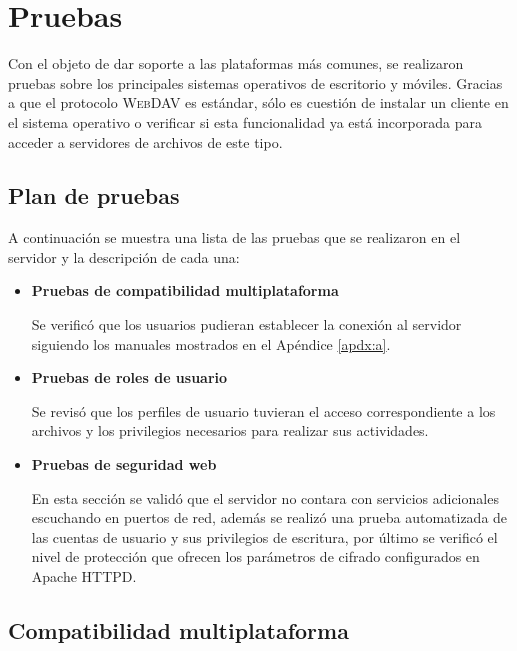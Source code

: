 {
  \linespread{1}
  \cleardoublepage  
  \chapter{Pruebas}
  \label{chap:cap4}
}

Con el objeto de dar soporte a las plataformas m\'{a}s comunes, se realizaron pruebas sobre los principales sistemas operativos de escritorio y m\'{o}viles. Gracias a que el protocolo \textsc{\gls{WebDAV}} es est\'{a}ndar, s\'{o}lo es cuesti\'{o}n de instalar un cliente en el sistema operativo o verificar si esta funcionalidad ya est\'{a} incorporada para acceder a servidores de archivos de este tipo.

    \section {Plan de pruebas}

A continuaci\'{o}n se muestra una lista de las pruebas que se realizaron en el servidor y la descripci\'{o}n de cada una:

\begin{itemize}

  \item \textbf{Pruebas de compatibilidad multiplataforma}

Se verific\'{o} que los usuarios pudieran establecer la conexi\'{o}n al servidor siguiendo los manuales mostrados en el \textup{Ap\'{e}ndice \ref{apdx:a}}.

  \item \textbf{Pruebas de roles de usuario}

Se revis\'{o} que los perfiles de usuario tuvieran el acceso correspondiente a los archivos y los privilegios necesarios para realizar sus actividades.

  \item \textbf{Pruebas de seguridad web}

En esta secci\'{o}n se valid\'{o} que el servidor no contara con servicios adicionales escuchando en puertos de red, adem\'{a}s se realiz\'{o} una prueba automatizada de las cuentas de usuario y sus privilegios de escritura, por \'{u}ltimo se verific\'{o} el nivel de protecci\'{o}n que ofrecen los par\'{a}metros de cifrado configurados en Apache \textsc{HTTPD}.

\end{itemize}

\newpage
    \section {Compatibilidad multiplataforma}

